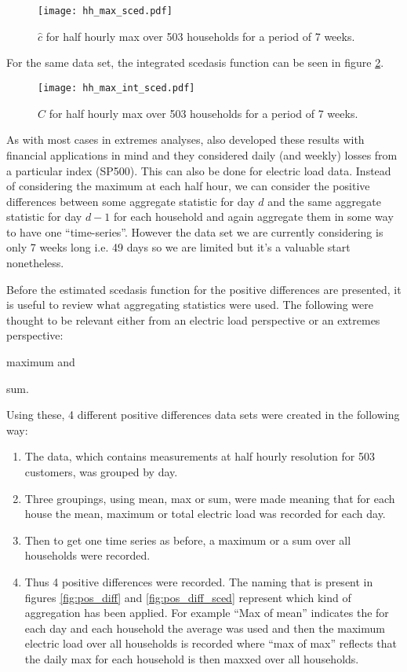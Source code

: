 \documentclass[a4paper]{article}
\begin{document}
\begin{figure}
\centering
\texttt{[image: hh\_max\_sced.pdf]}
\caption{\label{fig:mysced_hh_max} $\hat{c}$ for half hourly max over 503 households for a period of 7 weeks.}
\end{figure}

For the same data set, the integrated scedasis function can be seen in figure \ref{fig:myintsced_hh_max}.

\begin{figure}
\centering
\texttt{[image: hh\_max\_int\_sced.pdf]}
\caption{\label{fig:myintsced_hh_max} $\hat{C}$ for half hourly max over 503 households for a period of 7 weeks.}
\end{figure}

As with most cases in extremes analyses, \cite{einmahl16} also developed these results with financial applications in mind and they considered daily (and weekly) losses from a particular index (SP500). This can also be done for electric load data. Instead of considering the maximum at each half hour, we can consider the positive differences between some aggregate statistic for day $d$ and the same aggregate statistic for day $d-1$ for each household and again aggregate them in some way to have one ``time-series''. However the data set we are currently considering is only 7 weeks long i.e. 49 days so we are limited but it's a valuable start nonetheless.

Before the estimated scedasis function for the positive differences are presented, it is useful to review what aggregating statistics were used. The following were thought to be relevant either from an electric load perspective or an extremes perspective: \begin{enumerate*}[label=\roman*)] \item maximum and \item sum. \end{enumerate*} Using these, 4 different positive differences data sets were created in the following way:
\begin{enumerate}
\item The data, which contains measurements at half hourly resolution for 503 customers, was grouped by day.
\item Three groupings, using mean, max or sum, were made meaning that for each house the mean, maximum or total electric load was recorded for each day.
\item Then to get one time series as before, a maximum or a sum over all households were recorded.
\item Thus 4 positive differences were recorded. The naming that is present in figures \ref{fig:pos_diff} and \ref{fig:pos_diff_sced} represent which kind of aggregation has been applied. For example ``Max of mean'' indicates the for each day and each household the average was used and then the maximum electric load over all households is recorded where ``max of max'' reflects that the daily max for each household is then maxxed over all households.
\end{enumerate}
\end{document}
